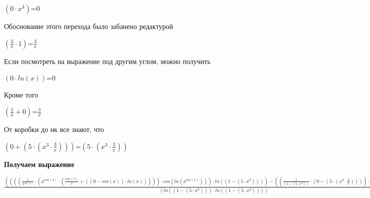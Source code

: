 \documentclass[12pt,a4paper,fleqn]{article}
\begin{document}
\begin{center}
$(0 \cdot x^{3})$=$0$\end{center}
Обоснование этого перехода было забанено редактурой

\begin{center}
$(\frac{3}{x} \cdot 1)$=$\frac{3}{x}$\end{center}
Если посмотреть на выражение под другим углом, можно получить

\begin{center}
$(0 \cdot ln(x))$=$0$\end{center}
Кроме того

\begin{center}
$(\frac{3}{x} + 0)$=$\frac{3}{x}$\end{center}
От коробки до нк все знают, что

\begin{center}
$(0 + (5 \cdot (x^{3} \cdot \frac{3}{x})))$=$(5 \cdot (x^{3} \cdot \frac{3}{x}))$\end{center}
\newpage \textbf{\Huge Получаем выражение}

$\frac{((((\frac{1}{x^{cos(x)}} \cdot (x^{cos(x)} \cdot (\frac{cos(x)}{x} + ((0 - sin(x)) \cdot ln(x))))) \cdot cos(ln(x^{cos(x)}))) \cdot ln((1 - (5 \cdot x^{3})))) - ((\frac{1}{(1 - (5 \cdot x^{3}))} \cdot (0 - (5 \cdot (x^{3} \cdot \frac{3}{x})))) \cdot sin(ln(x^{cos(x)}))))}{(ln((1 - (5 \cdot x^{3}))) \cdot ln((1 - (5 \cdot x^{3}))))}$
\end{document}
